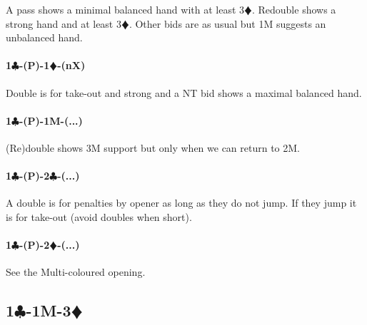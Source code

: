 \documentclass[a4paper]{article}
\newcommand{\BC}{\textcolor{OliveGreen}{$\clubsuit$}}
\newcommand{\BD}{\textcolor{RedOrange}{$\vardiamondsuit$}}
\newcommand{\pdfc}{\texorpdfstring{\BC{}}{C}}
\newcommand{\pdfd}{\texorpdfstring{\BD{}}{D}}
\begin{document}
A pass shows a minimal balanced hand with at least 3\BD . Redouble shows a strong hand and at
least 3\BD . Other bids are as usual but 1M suggests an unbalanced hand.
\bigbreak
\paragraph{1\pdfc-(P)-1\pdfd-(nX)}

Double is for take-out and strong and a NT bid shows a maximal balanced hand.
\bigbreak
\paragraph{1\pdfc-(P)-1M-(...)}

(Re)double shows 3M support but only when we can return to 2M.
\bigbreak
\paragraph{1\pdfc-(P)-2\pdfc-(...)}

A double is for penalties by opener as long as they do not jump. If they jump
it is for take-out (avoid doubles when short).
\bigbreak
\paragraph{1\pdfc-(P)-2\pdfd-(...)}

See the Multi-coloured opening.
\bigbreak
\subsection{1\pdfc-1M-3\pdfd}
\end{document}
